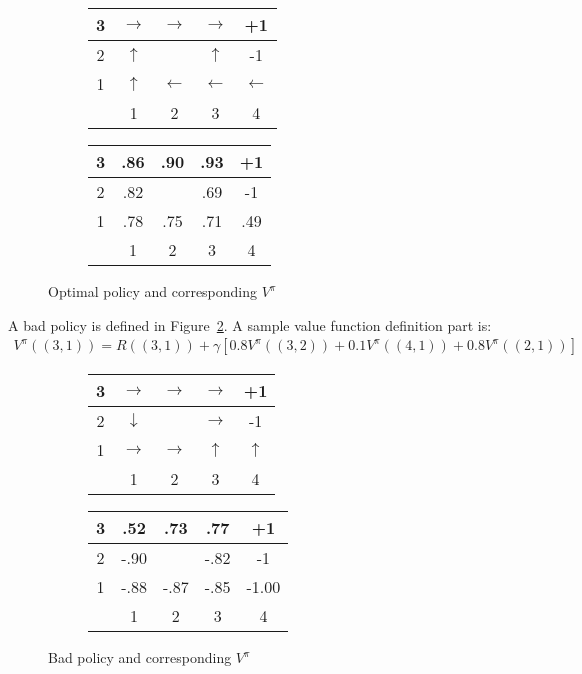 \documentclass{report}
\begin{document}
\begin{figure}[h!]
\centering
\begin{subfigure}[b]{0.4\textwidth}
\begin{tabular}{c|c|c|c|c|}
\hline
3 & $\rightarrow$ & $\rightarrow$ & $\rightarrow$ & +1 \\
\hline
2 & $\uparrow$ & \cellcolor{black} & $\uparrow$ & -1 \\
\hline
1 & $\uparrow$ & $\leftarrow$ & $\leftarrow$ & $\leftarrow$ \\
\hline
& 1 & 2 & 3 & 4 \\
\end{tabular}
\end{subfigure}
\begin{subfigure}[b]{0.4\textwidth}
\begin{tabular}{c|c|c|c|c|}
\hline
3 & .86 & .90 & .93 & +1 \\
\hline
2 & .82 &\cellcolor{black} & .69 & -1 \\
\hline
1 & .78 & .75 & .71 & .49 \\
\hline
& 1 & 2 & 3 & 4 \\
\end{tabular}
\end{subfigure}
\caption{Optimal policy and corresponding $V^{\pi}$}
\label{ref:sampleworldoptimalpolicy}
\end{figure}

A bad policy is defined in Figure~\ref{ref:sampleworldoptimalpolicy1}. A sample value function definition part is:
\begin{align*}
V^{\pi}((3,1))=R((3,1)) + \gamma[0.8V^{\pi}((3,2))+0.1V^{\pi}((4,1))+0.8V^{\pi}((2,1))]
\end{align*}

\begin{figure}[h!]
\centering
\begin{subfigure}[b]{0.4\textwidth}
\begin{tabular}{c|c|c|c|c|}
\hline
3 & $\rightarrow$ & $\rightarrow$ & $\rightarrow$ & +1 \\
\hline
2 & $\downarrow$ & \cellcolor{black} & $\rightarrow$ & -1 \\
\hline
1 & $\rightarrow$ & $\rightarrow$ & $\uparrow$ & $\uparrow$ \\
\hline
& 1 & 2 & 3 & 4 \\
\end{tabular}
\end{subfigure}
\begin{subfigure}[b]{0.4\textwidth}
\begin{tabular}{c|c|c|c|c|}
\hline
3 & .52 & .73 & .77 & +1 \\
\hline
2 & -.90 &\cellcolor{black} & -.82 & -1 \\
\hline
1 & -.88 & -.87 & -.85 & -1.00 \\
\hline
& 1 & 2 & 3 & 4 \\
\end{tabular}
\end{subfigure}
\caption{Bad policy and corresponding $V^{\pi}$}
\label{ref:sampleworldoptimalpolicy1}
\end{figure}
\end{document}
